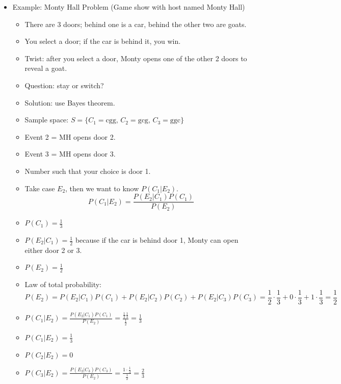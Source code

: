 \begin{itemize}
    \item Example: Monty Hall Problem (Game show with host named Monty Hall)
          \begin{itemize}
              \item There are 3 doors; behind one is a car, behind the other two are goats.
              \item You select a door; if the car is behind it, you win.
              \item Twist: after you select a door, Monty opens one of the other 2 doors to reveal a goat.
              \item Question: stay or switch?
              \item Solution: use Bayes theorem.
              \item Sample space: $S = \{ C_1 = \text{cgg},\, C_2 = \text{gcg},\, C_3 = \text{ggc} \}$
              \item Event 2 = MH opens door 2.
              \item Event 3 = MH opens door 3.
              \item Number such that your choice is door 1.
              \item Take case $E_2$, then we want to know $P(C_1|E_2)$.
                    \[ P(C_1 | E_2) = \frac{P(E_2 | C_1) P(C_1)}{P(E_2)} \]
              \item $P(C_1)= \frac{1}{3}$
              \item $P(E_2 | C_1) = \frac{1}{2}$ because if the car is behind door 1, Monty can open either door 2 or 3.
              \item $P(E_2) = \frac{1}{2}$
              \item Law of total probability:
                    \[ P(E_2) = P(E_2 | C_1) P(C_1) + P(E_2 | C_2) P(C_2) + P(E_2 | C_3) P(C_3)  = \frac{1}{2} \cdot \frac{1}{3} + 0 \cdot \frac{1}{3} + 1 \cdot \frac{1}{3} = \frac{1}{2} \]
              \item $P(C_1 | E_2) = \frac{P(E_2 | C_1) P(C_1)}{P(E_2)} = \frac{\frac{1}{2} \frac{1}{3}}{\frac{1}{2}} = \frac{1}{3}$
              \item $P(C_1 | E_2) = \frac{1}{3}$
              \item $P(C_2 |E_2) = 0$
              \item $P(C_3 |E_2) = \frac{P(E_2 | C_3) P(C_3)}{P(E_2)} = \frac{1 \cdot \frac{1}{3}}{\frac{1}{2}} = \frac{2}{3}$
          \end{itemize}
\end{itemize}

